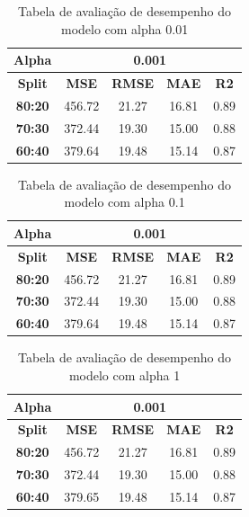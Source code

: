 \begin{table}[H]
\centering
\begin{tabular}{|c|c|c|c|c|}
\hline
\textbf{Alpha} & \multicolumn{4}{|c|}{\textbf{0.001}} \\
\hline
\textbf{Split} & \textbf{MSE} & \textbf{RMSE} & \textbf{MAE} & \textbf{R2} \\
\hline
\textbf{80:20} & 456.72 & 21.27 & 16.81 & 0.89 \\
\textbf{70:30} & 372.44 & 19.30 & 15.00 & 0.88 \\
\textbf{60:40} & 379.64 & 19.48 & 15.14 & 0.87 \\
\hline
\end{tabular}
\caption{Tabela de avaliação de desempenho do modelo com alpha 0.01}
\end{table}

\begin{table}[H]
\centering
\begin{tabular}{|c|c|c|c|c|}
\hline
\textbf{Alpha} & \multicolumn{4}{|c|}{\textbf{0.001}} \\
\hline
\textbf{Split} & \textbf{MSE} & \textbf{RMSE} & \textbf{MAE} & \textbf{R2} \\
\hline
\textbf{80:20} & 456.72 & 21.27 & 16.81 & 0.89 \\
\textbf{70:30} & 372.44 & 19.30 & 15.00 & 0.88 \\
\textbf{60:40} & 379.64 & 19.48 & 15.14 & 0.87 \\
\hline
\end{tabular}
\caption{Tabela de avaliação de desempenho do modelo com alpha 0.1}
\end{table}

\begin{table}[H]
\centering
\begin{tabular}{|c|c|c|c|c|}
\hline
\textbf{Alpha} & \multicolumn{4}{|c|}{\textbf{0.001}} \\
\hline
\textbf{Split} & \textbf{MSE} & \textbf{RMSE} & \textbf{MAE} & \textbf{R2} \\
\hline
\textbf{80:20} & 456.72 & 21.27 & 16.81 & 0.89 \\
\textbf{70:30} & 372.44 & 19.30 & 15.00 & 0.88 \\
\textbf{60:40} & 379.65 & 19.48 & 15.14 & 0.87 \\
\hline
\end{tabular}
\caption{Tabela de avaliação de desempenho do modelo com alpha 1}
\end{table}

